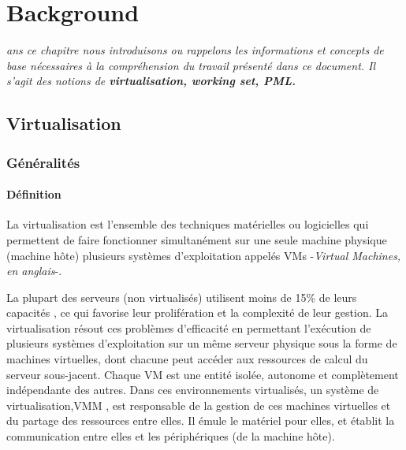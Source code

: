\let\textcircled=\pgftextcircled
\chapter{Background}
\label{chap:background}

\textit{ans ce chapitre nous introduisons ou rappelons les informations et concepts de base nécessaires à la compréhension du travail présenté dans ce document. Il s'agit des notions de \textbf{virtualisation, working set, PML.}}\\
\par

\minitoc

\newpage    
\section{Virtualisation}

\subsection{Généralités}

\subsubsection{Définition}
\par\noindent La virtualisation est l’ensemble des techniques matérielles ou logicielles qui permettent de faire fonctionner simultanément sur une seule machine physique (machine hôte) plusieurs systèmes d’exploitation appelés \ac{VMs} -\textit{Virtual Machines, en anglais}-.\\

\par\noindent La plupart des serveurs (non virtualisés) utilisent moins de 15\% de leurs capacités \cite{online1}, ce qui favorise leur prolifération et la complexité de leur gestion. La virtualisation résout ces problèmes d’efficacité en permettant l'exécution de plusieurs systèmes d’exploitation sur un même serveur physique sous la forme de machines virtuelles, dont chacune peut accéder aux ressources de calcul du serveur sous-jacent. Chaque VM est une entité isolée, autonome et complètement indépendante des autres. Dans ces environnements virtualisés, un système
de virtualisation,\ac{VMM} , est responsable de la gestion de ces machines virtuelles et du partage des ressources entre elles. Il émule le matériel pour elles, et établit la communication entre elles et les périphériques (de la machine hôte).

